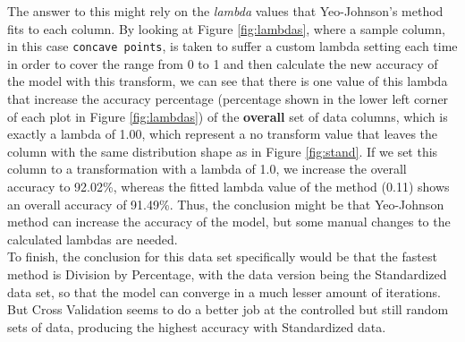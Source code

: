 \documentclass[11pt]{article}
\begin{document}
The answer to this might rely on the \textit{lambda} values that Yeo-Johnson's method fits to each column. By looking at Figure \ref{fig:lambdas}, where a sample column, in this case \verb$concave points$, is taken to suffer a custom lambda setting each time in order to cover the range from 0 to 1 and then calculate the new accuracy of the model with this transform, we can see that there is one value of this lambda that increase the accuracy percentage (percentage shown in the lower left corner of each plot in Figure \ref{fig:lambdas}) of the \textbf{overall} set of data columns, which is exactly a lambda of 1.00, which represent a no transform value that leaves the column with the same distribution shape as in Figure \ref{fig:stand}. If we set this column to a transformation with a lambda of 1.0, we increase the overall accuracy to 92.02\%, whereas the fitted lambda value of the method (0.11) shows an overall accuracy of 91.49\%. Thus, the conclusion might be that Yeo-Johnson method can increase the accuracy of the model, but some manual changes to the calculated lambdas are needed.
\\

To finish, the conclusion for this data set specifically would be that the fastest method is Division by Percentage, with the data version being the Standardized data set, so that the model can converge in a much lesser amount of iterations. But Cross Validation seems to do a better job at the controlled but still random sets of data, producing the highest accuracy with Standardized data.

\printbibliography
 
\end{document}
